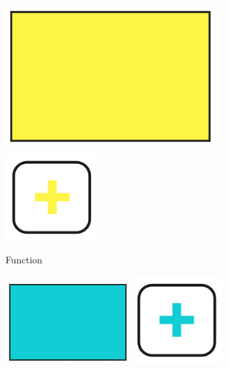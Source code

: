 \documentclass[../main.tex]{subfiles}
\begin{document}
\begin{figure}
  \begin{subfigure}[t]{0.2\textwidth}\centering
    \includegraphics[width=.8\textwidth]{img/IMFmanual-img020.png}
    \includegraphics[width=.25\textwidth]{img/IMFmanual-img024.png}
    \caption{Function}
  \end{subfigure}
  \hfill
  \begin{subfigure}[t]{0.2\textwidth}\centering
    \includegraphics[width=.8\textwidth]{img/IMFmanual-img021.png}
    \includegraphics[width=.25\textwidth]{img/IMFmanual-img025.png}

\end{subfigure}
\end{figure}
\end{document}
